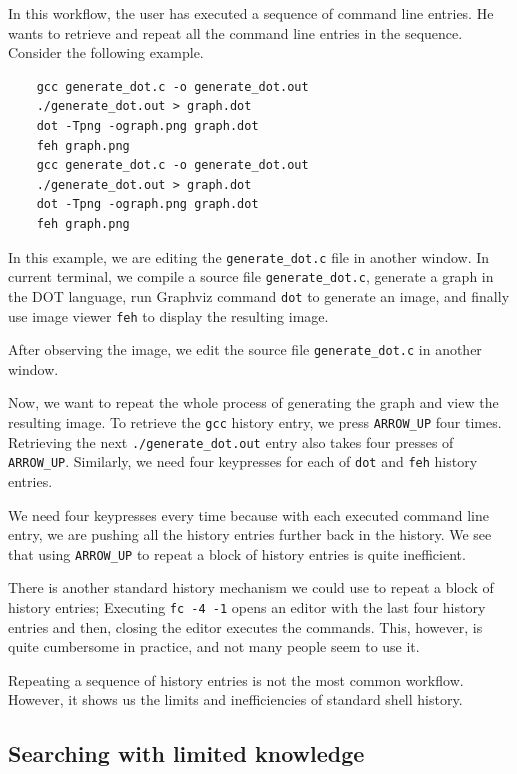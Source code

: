 In this workflow, the user has executed a sequence of command line entries. He wants to retrieve and repeat all the command line entries in the sequence. 
Consider the following example.

\begin{verbatim}
    gcc generate_dot.c -o generate_dot.out
    ./generate_dot.out > graph.dot
    dot -Tpng -ograph.png graph.dot
    feh graph.png
    gcc generate_dot.c -o generate_dot.out
    ./generate_dot.out > graph.dot
    dot -Tpng -ograph.png graph.dot
    feh graph.png
\end{verbatim}

In this example, we are editing the \verb|generate_dot.c| file in another window. In current terminal, we compile a source file \verb|generate_dot.c|, generate a graph in the DOT\cite{graphvizthedotlanguage} language, run Graphviz\cite{ellson2001graphviz} command \verb|dot| to generate an image, and finally use image viewer \verb|feh|\cite{toolsfeh} to display the resulting image.

After observing the image, we edit the source file \verb|generate_dot.c| in another window.


Now, we want to repeat the whole process of generating the graph and view the resulting image. To retrieve the \verb|gcc| history entry, we press \verb|ARROW_UP| four times. Retrieving the next \verb|./generate_dot.out| entry also takes four presses of \verb|ARROW_UP|. Similarly, we need four keypresses for each of \verb|dot| and \verb|feh| history entries. 

We need four keypresses every time because with each executed command line entry, we are pushing all the history entries further back in the history. We see that using \verb|ARROW_UP| to repeat a block of history entries is quite inefficient. 

There is another standard history mechanism we could use to repeat a block of history entries; 
Executing \verb|fc -4 -1| opens an editor with the last four history entries and then, closing the editor executes the commands. This, however, is quite cumbersome in practice, and not many people seem to use it. 


Repeating a sequence of history entries is not the most common workflow. However, it shows us the limits and inefficiencies of standard shell history.


\subsection{Searching with limited knowledge}\label{workflow-search-w-limited-knowledge}

